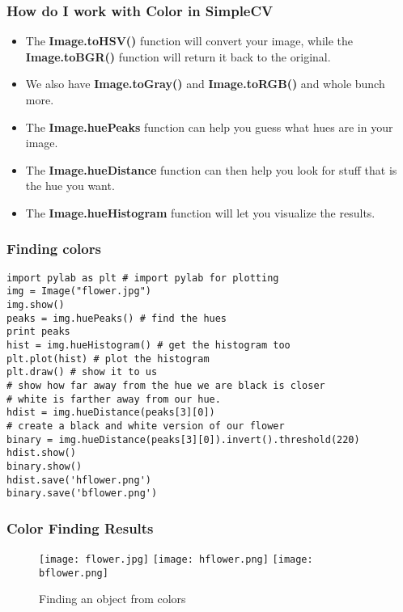 \documentclass[compress]{beamer}
\begin{document}
\begin{frame}
\frametitle{How do I work with Color in SimpleCV}
\begin{itemize}
\item The \textbf{Image.toHSV()} function will convert your image, while the
\textbf{Image.toBGR()} function will return it back to the original.
\item We also have \textbf{Image.toGray()} and \textbf{Image.toRGB()}
  and whole bunch more. 
\item The \textbf{Image.huePeaks} function can help you guess what
  hues are in your image.
\item The \textbf{Image.hueDistance} function can then help you look
  for stuff that is the hue you want. 
\item The \textbf{Image.hueHistogram} function will let you visualize
  the results. 
\end{itemize}
\end{frame}
\begin{frame}[fragile] 
\frametitle{Finding colors}
\begin{example}
\begin{verbatim}
import pylab as plt # import pylab for plotting
img = Image("flower.jpg")
img.show()
peaks = img.huePeaks() # find the hues
print peaks
hist = img.hueHistogram() # get the histogram too
plt.plot(hist) # plot the histogram
plt.draw() # show it to us
# show how far away from the hue we are black is closer
# white is farther away from our hue.
hdist = img.hueDistance(peaks[3][0]) 
# create a black and white version of our flower
binary = img.hueDistance(peaks[3][0]).invert().threshold(220)
hdist.show()
binary.show()
hdist.save('hflower.png')
binary.save('bflower.png')
\end{verbatim}
\end{example}
\end{frame}
\begin{frame}
\frametitle{Color Finding Results}
 \begin{figure}
     \texttt{[image: flower.jpg]}
     \quad
     \texttt{[image: hflower.png]}
     \quad
     \texttt{[image: bflower.png]}
     \quad
     \caption{Finding an object from colors}
 \end{figure}
\end{frame}
\end{document}
